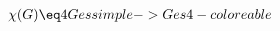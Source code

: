 \documentclass[preview]{standalone}
\begin{document}
\begin{align*}
\chi(G) \eq 4 G es simple -> G es 4-coloreable
\end{align*}
\end{document}
